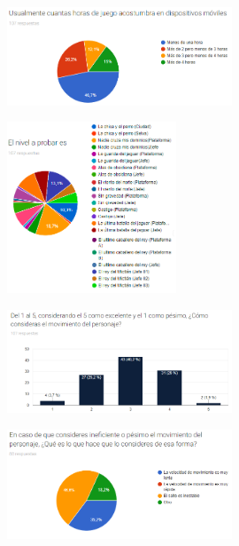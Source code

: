 \begin{figure}[H]
    \centering
    \includegraphics[width=0.6\textwidth]{Anexos/respuestas/grafica05.png}
\end{figure}

\begin{figure}[H]
    \centering
    \includegraphics[width=0.45\textwidth]{Anexos/respuestas/grafica06.png}
\end{figure}

\begin{figure}[H]
    \centering
    \includegraphics[width=0.6\textwidth]{Anexos/respuestas/grafica07.png}
\end{figure}

\begin{figure}[H]
    \centering
    \includegraphics[width=0.6\textwidth]{Anexos/respuestas/grafica08.png}
\end{figure}

